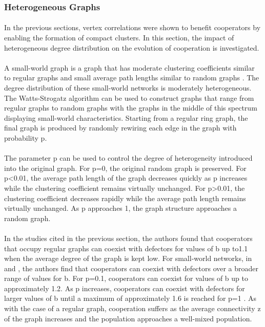 \documentclass{article}
\begin{document}
    \subsubsection{Heterogeneous Graphs}
	\paragraph{}In the previous sections, vertex correlations were shown to benefit cooperators by enabling the formation of compact clusters.  In this section, the impact of heterogeneous degree distribution on the evolution of cooperation is investigated.
	\paragraph{}A small-world graph is a graph that has moderate clustering coefficients similar to regular graphs and small average path lengths similar to random graphs \cite{Watts1998}.  The degree distribution of these small-world networks is moderately heterogeneous.  The Watts-Strogatz algorithm \cite{Watts1998} can be used to construct graphs that range from regular graphs to random graphs with the graphs in the middle of this spectrum displaying small-world characteristics.  Starting from a regular ring graph, the final graph is produced by randomly rewiring each edge in the graph with probability p.
	\paragraph{}The parameter p can be used to control the degree of heterogeneity introduced into the original graph.  For p=0, the original random graph is preserved.  For p<0.01, the average path length of the graph decreases quickly as p increases while the clustering coefficient remains virtually unchanged.  For p>0.01, the clustering coefficient decreases rapidly while the average path length remains virtually unchanged.  As p approaches 1, the graph structure approaches a random graph.
	\paragraph{}In the studies cited in the previous section, the authors found that cooperators that occupy regular graphs can coexist with defectors for values of b up to1.1 when the average degree of the graph is kept low.  For small-world networks, in \cite{Pacheco2005} and \cite{Santos2006b}, the authors find that cooperators can coexist with defectors over a broader range of values for b.  For p=0.1, cooperators can coexist for values of b up to approximately 1.2.  As p increases, cooperators can coexist with defectors for larger values of b until a maximum of approximately 1.6 is reached for p=1 \cite{Santos2006b}.  As with the case of a regular graph, cooperation suffers as the average connectivity z of the graph increases and the population approaches a well-mixed population.
\end{document}

